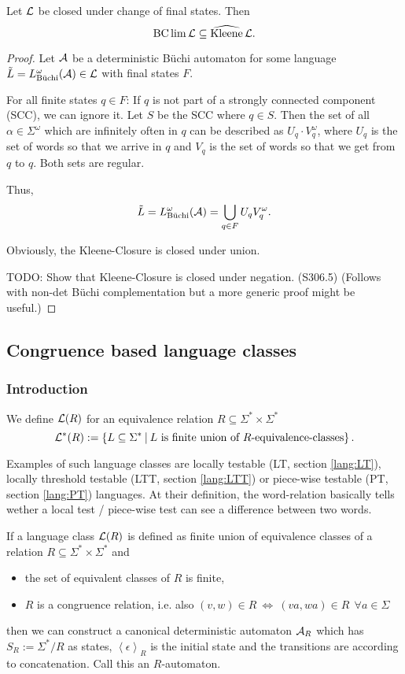 \begin{lemma}
Let $\mathcal{L}$ be closed under change of final states. Then
\[ \operatorname{BC} \lim \mathcal{L} \subseteq \operatorname{\widehat{Kleene}} \mathcal{L} . \]
\begin{proof}
Let $\mathcal{A}$ be a deterministic Büchi automaton for some language $\tilde L = L^\omega_{\text{Büchi}}(\mathcal{A}) \in \mathcal{L}$ with final states $F$.

For all finite states $q \in F$: If $q$ is not part of a strongly connected component (SCC), we can ignore it. Let $S$ be the SCC where $q \in S$. Then the set of all $\alpha \in \Sigma^\omega$ which are infinitely often in $q$ can be described as $U_q \cdot V_q^\omega$, where $U_q$ is the set of words so that we arrive in $q$ and $V_q$ is the set of words so that we get from $q$ to $q$. Both sets are regular.

Thus,
\[ \tilde L = L^\omega_{\text{Büchi}}(\mathcal{A}) = \bigcup_{q \in F} U_q V_q^\omega . \]

Obviously, the Kleene-Closure is closed under union.

TODO: Show that Kleene-Closure is closed under negation. (S306.5) (Follows with non-det Büchi complementation but a more generic proof might be useful.)
\end{proof}
\end{lemma}

\subsection{Congruence based language classes}

\subsubsection{Introduction}
\label{gen:R-automata}

\begin{mydef}
We define $\mathcal{L}(R)$ for an equivalence relation $R\subseteq\Sigma^* \times \Sigma^*$
\[ \Lang^*(R) := \Set{L \subseteq \Sigma^*}{L \text{ is finite union of $R$-equivalence-classes}} . \]
\end{mydef}

Examples of such language classes are locally testable (LT, section \ref{lang:LT}), locally threshold testable (LTT, section \ref{lang:LTT}) or piece-wise testable (PT, section \ref{lang:PT}) languages. At their definition, the word-relation basically tells wether a local test / piece-wise test can see a difference between two words.

If a language class $\mathcal{L}(R)$ is defined as finite union of equivalence classes of a relation $R \subseteq \Sigma^* \times \Sigma^*$ and
\begin{itemize}
\item the set of equivalent classes of $R$ is finite,
\item $R$ is a congruence relation, i.e. also $(v,w) \in R \ \Leftrightarrow \ (va,wa) \in R \ \ \forall a \in \Sigma$
\end{itemize}
then we can construct a canonical deterministic automaton $\mathcal{A}_R$ which has $S_R := \Sigma^* / R$ as states, $\left<\epsilon\right>_R$ is the initial state and the transitions are according to concatenation. Call this an $R$-automaton.

